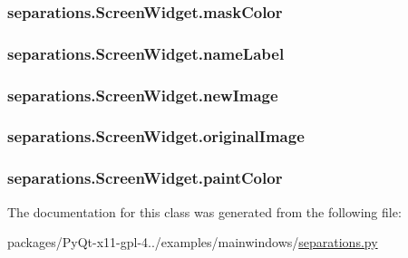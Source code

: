 \subsubsection[{mask\+Color}]{\setlength{\rightskip}{0pt plus 5cm}separations.\+Screen\+Widget.\+mask\+Color}\label{classseparations_1_1ScreenWidget_a9432bb589b03c2af34c73a8ff7984d43}
\hypertarget{classseparations_1_1ScreenWidget_ac1e7db1832c291af9fedf7247092de8d}{}
\subsubsection[{name\+Label}]{\setlength{\rightskip}{0pt plus 5cm}separations.\+Screen\+Widget.\+name\+Label}\label{classseparations_1_1ScreenWidget_ac1e7db1832c291af9fedf7247092de8d}
\hypertarget{classseparations_1_1ScreenWidget_adbeedd88b7bdd627271363540da0acdd}{}
\subsubsection[{new\+Image}]{\setlength{\rightskip}{0pt plus 5cm}separations.\+Screen\+Widget.\+new\+Image}\label{classseparations_1_1ScreenWidget_adbeedd88b7bdd627271363540da0acdd}
\hypertarget{classseparations_1_1ScreenWidget_a1d5128a2c4c37cf87807ad899088954a}{}
\subsubsection[{original\+Image}]{\setlength{\rightskip}{0pt plus 5cm}separations.\+Screen\+Widget.\+original\+Image}\label{classseparations_1_1ScreenWidget_a1d5128a2c4c37cf87807ad899088954a}
\hypertarget{classseparations_1_1ScreenWidget_a5cea299824b874d0175e4e1e3df619c8}{}
\subsubsection[{paint\+Color}]{\setlength{\rightskip}{0pt plus 5cm}separations.\+Screen\+Widget.\+paint\+Color}\label{classseparations_1_1ScreenWidget_a5cea299824b874d0175e4e1e3df619c8}


The documentation for this class was generated from the following file\+:\begin{DoxyCompactItemize}
\item 
packages/\+Py\+Qt-\/x11-\/gpl-\/4../examples/mainwindows/\hyperlink{separations_8py}{separations.\+py}\end{DoxyCompactItemize}
